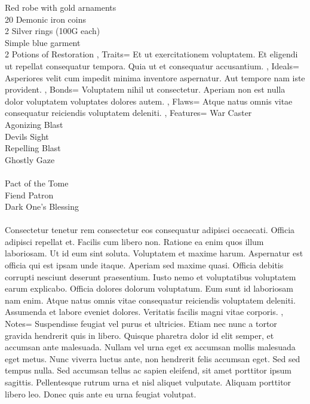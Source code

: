 \documentclass[10pt,a4paper]{scrbook}
\begin{document}
{{			Red robe with gold arnaments\\
			20 Demonic iron coins\\
			2 Silver rings (100G each)\\
			Simple blue garment\\
			2 Potions of Restoration
		},
		Traits={
			Et ut exercitationem voluptatem.
			Et eligendi ut repellat consequatur tempora.
			Quia ut et consequatur accusantium.
		},
		Ideals={
			Asperiores velit cum impedit minima inventore aspernatur.
			Aut tempore nam iste provident.
		},
		Bonds={
			Voluptatem nihil ut consectetur.
			Aperiam non est nulla dolor voluptatem voluptates dolores autem.
		},
		Flaws={
			Atque natus omnis vitae consequatur reiciendis voluptatem deleniti.
		},
		Features={
			War Caster\\
			Agonizing Blast\\
			Devils Sight\\
			Repelling Blast\\
			Ghostly Gaze\\
			\\
			Pact of the Tome\\
			Fiend Patron\\
			Dark One's Blessing\\
			\\
			Consectetur tenetur rem consectetur eos consequatur adipisci occaecati.
			Officia adipisci repellat et.
			Facilis cum libero non.
			Ratione ea enim quos illum laboriosam.
			Ut id eum sint soluta.
			Voluptatem et maxime harum.
			Aspernatur est officia qui est ipsam unde itaque.
			Aperiam sed maxime quasi.
			Officia debitis corrupti nesciunt deserunt praesentium.
			Iusto nemo et voluptatibus voluptatem earum explicabo.
			Officia dolores dolorum voluptatum.
			Eum sunt id laboriosam nam enim.
			Atque natus omnis vitae consequatur reiciendis voluptatem deleniti.
			Assumenda et labore eveniet dolores.
			Veritatis facilis magni vitae corporis.
		},
		Notes={
			Suspendisse feugiat vel purus et ultricies.
			Etiam nec nunc a tortor gravida hendrerit quis in libero.
			Quisque pharetra dolor id elit semper,
			et accumsan ante malesuada.
			Nullam vel urna eget ex accumsan mollis malesuada eget metus.
			Nunc viverra luctus ante, non hendrerit felis accumsan eget.
			Sed sed tempus nulla. Sed accumsan tellus ac sapien eleifend,
			sit amet porttitor ipsum sagittis.
			Pellentesque rutrum urna et nisl aliquet vulputate.
			Aliquam porttitor libero leo.
			Donec quis ante eu urna feugiat volutpat.
		}
	}
\end{document}
